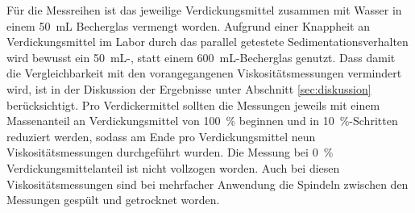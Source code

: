 Für die Messreihen ist das jeweilige Verdickungsmittel zusammen mit Wasser in einem \SI{50}{\milli \liter} Becherglas vermengt worden. Aufgrund einer Knappheit an Verdickungsmittel im Labor durch das parallel getestete Sedimentationsverhalten wird bewusst ein \SI{50}{\milli \liter}-, statt einem  \SI{600}{\milli \liter}-Becherglas genutzt. Dass damit die Vergleichbarkeit mit den vorangegangenen Viskositätsmessungen vermindert wird, ist in der Diskussion der Ergebnisse unter Abschnitt \ref{sec:diskussion} berücksichtigt. Pro Verdickermittel sollten die Messungen  jeweils mit einem Massenanteil an Verdickungsmittel von \SI{100}{\percent} beginnen und in \SI{10}{\percent}-Schritten reduziert werden, sodass am Ende pro Verdickungsmittel neun Viskositätsmessungen durchgeführt wurden. Die Messung bei \SI{0}{\percent} Verdickungsmittelanteil ist nicht vollzogen worden. Auch bei diesen Viskositätsmessungen sind bei mehrfacher Anwendung die Spindeln zwischen den Messungen gespült und getrocknet worden. 

